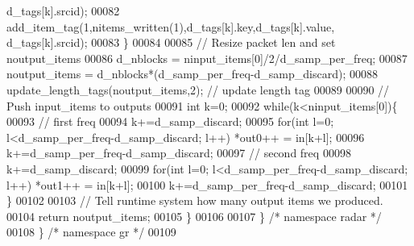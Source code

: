 \begin{DoxyCode}
      d_tags[k].srcid);
00082             add\_item\_tag(1,nitems\_written(1),d_tags[k].key,d_tags[k].value,
      d_tags[k].srcid);
00083         \}
00084         
00085         \textcolor{comment}{// Resize packet len and set noutput\_items}
00086         d_nblocks = ninput\_items[0]/2/d_samp_per_freq;
00087         noutput\_items = d_nblocks*(d_samp_per_freq-d_samp_discard);
00088         update\_length\_tags(noutput\_items,2); \textcolor{comment}{// update length tag}
00089         
00090         \textcolor{comment}{// Push input\_items to outputs}
00091         \textcolor{keywordtype}{int} k=0;
00092         \textcolor{keywordflow}{while}(k<ninput\_items[0])\{
00093             \textcolor{comment}{// first freq}
00094             k+=d_samp_discard;
00095             \textcolor{keywordflow}{for}(\textcolor{keywordtype}{int} l=0; l<d_samp_per_freq-d_samp_discard; l++) *out0++ = in[k+l];
00096             k+=d_samp_per_freq-d_samp_discard;
00097             \textcolor{comment}{// second freq}
00098             k+=d_samp_discard;
00099             \textcolor{keywordflow}{for}(\textcolor{keywordtype}{int} l=0; l<d_samp_per_freq-d_samp_discard; l++) *out1++ = in[k+l];
00100             k+=d_samp_per_freq-d_samp_discard;
00101         \}
00102 
00103         \textcolor{comment}{// Tell runtime system how many output items we produced.}
00104         \textcolor{keywordflow}{return} noutput\_items;
00105     \}
00106 
00107   \} \textcolor{comment}{/* namespace radar */}
00108 \} \textcolor{comment}{/* namespace gr */}
00109 
\end{DoxyCode}
